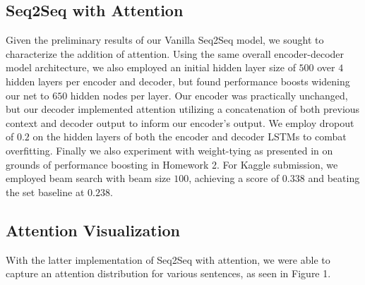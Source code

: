\documentclass[11pt]{article}
\begin{document}
\subsection{Seq2Seq with Attention}
Given the preliminary results of our Vanilla Seq2Seq model, we sought to characterize the addition of attention. Using the same overall encoder-decoder model architecture, we also employed an initial hidden layer size of $500$ over $4$ hidden layers per encoder and decoder, but found performance boosts widening our net to $650$ hidden nodes per layer. Our encoder was practically unchanged, but our decoder implemented attention utilizing a concatenation of both previous context and decoder output to inform our encoder's output. We employ dropout of $0.2$ on the hidden layers of both the encoder and decoder LSTMs to combat overfitting. Finally we also experiment with weight-tying as presented in \cite{DBLP:journals/corr/PressW16} on grounds of performance boosting in Homework 2. For Kaggle submission, we employed beam search with beam size $100$, achieving a score of $0.338$ and beating the set baseline at $0.238$.

\subsection{Attention Visualization}

With the latter implementation of Seq2Seq with attention, we were able to capture an attention distribution for various sentences, as seen in Figure 1. 
\end{document}

